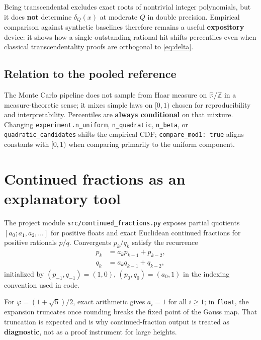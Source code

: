\documentclass[
]{article}
\begin{document}
Being transcendental excludes exact roots of nontrivial integer
polynomials, but it does \textbf{not} determine \(\delta_Q(x)\) at
moderate \(Q\) in double precision. Empirical comparison against
synthetic baselines therefore remains a useful \textbf{expository}
device: it shows how a single outstanding rational hit shifts
percentiles even when classical transcendentality proofs are orthogonal
to \eqref{eq:delta}.

\subsection{Relation to the pooled
reference}\label{relation-to-the-pooled-reference}

The Monte Carlo pipeline does not sample from Haar measure on
\(\mathbb{R}/\mathbb{Z}\) in a measure-theoretic sense; it mixes simple
laws on \([0,1)\) chosen for reproducibility and interpretability.
Percentiles are \textbf{always conditional} on that mixture. Changing
\texttt{experiment.n\_uniform}, \texttt{n\_quadratic}, \texttt{n\_beta},
or \texttt{quadratic\_candidates} shifts the empirical CDF;
\texttt{compare\_mod1:\ true} aligns constants with \([0,1)\) when
comparing primarily to the uniform component.

\newpage

\section{Continued fractions as an explanatory
tool}\label{continued-fractions-as-an-explanatory-tool}

The project module \texttt{src/continued\_fractions.py} exposes partial
quotients \([a_0; a_1, a_2, \ldots]\) for positive floats and exact
Euclidean continued fractions for positive rationals \(p/q\).
Convergents \(p_k/q_k\) satisfy the recurrence \begin{align}
p_k &= a_k p_{k-1} + p_{k-2}, \\
q_k &= a_k q_{k-1} + q_{k-2},
\end{align} initialized by \((p_{-1},q_{-1})=(1,0)\),
\((p_0,q_0)=(a_0,1)\) in the indexing convention used in code.

For \(\varphi = (1+\sqrt{5})/2\), exact arithmetic gives \(a_i=1\) for
all \(i \geq 1\); in \texttt{float}, the expansion truncates once
rounding breaks the fixed point of the Gauss map. That truncation is
expected and is why continued-fraction output is treated as
\textbf{diagnostic}, not as a proof instrument for large heights.
\end{document}

